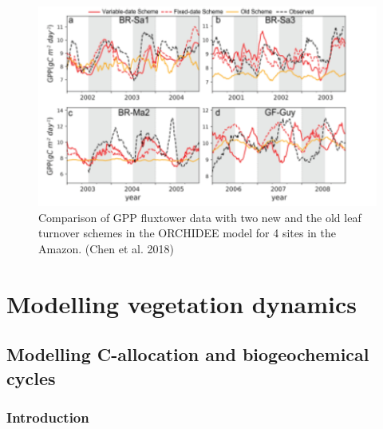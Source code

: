 \documentclass[
  12pt,
  oneside]{book}
\begin{document}
\begin{figure}

{\centering \includegraphics[width=0.8\linewidth]{figures/chap4/f413_chen3} 

}

\caption{Comparison of GPP fluxtower data with two new and the old leaf turnover schemes in the ORCHIDEE model for 4 sites in the Amazon. (Chen et al. 2018)}\label{fig:f413}
\end{figure}

\hypertarget{part-modelling-vegetation-dynamics}{%
\part{Modelling vegetation dynamics}\label{part-modelling-vegetation-dynamics}}

\hypertarget{modelling-c-allocation-and-biogeochemical-cycles}{%
\chapter{Modelling C-allocation and biogeochemical cycles}\label{modelling-c-allocation-and-biogeochemical-cycles}}


\hypertarget{introduction-1}{%
\section{Introduction}\label{introduction-1}}
\end{document}
